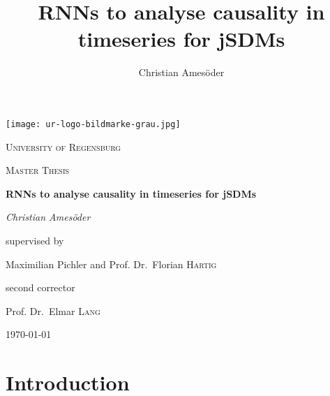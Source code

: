 \documentclass[a4paper]{proc}
\begin{document}
 
	
	\author{Christian Ames\"oder}

\title {RNNs to analyse causality in timeseries for jSDMs}

\begin{titlepage}
	\centering
	\texttt{[image: ur-logo-bildmarke-grau.jpg]}\par\vspace{1cm}
	{\scshape \LARGE University of Regensburg\par}
	\vspace{1cm}
	{\scshape\Large Master Thesis\par}
	\vspace{1.5cm}
	{\huge\bfseries RNNs to analyse causality in timeseries for jSDMs\par}
	\vspace{2cm}
	{\Large\itshape Christian Ames\"oder\par}
	\vfill
	supervised by\par
	Maximilian Pichler and Prof. Dr.~Florian \textsc{Hartig}
	
	\vfill
	
	second corrector \par
	Prof. Dr.~Elmar \textsc{Lang}
	\vfill
	
	{\large \today\par}
\end{titlepage}



	\section{Introduction}
	
	
	
\end{document}
